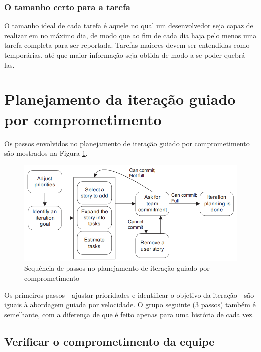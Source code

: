 \documentclass[a4paper,abntfigtabnum,noindentfirst]{abnt}
\begin{document}
\subsubsection{O tamanho certo para a tarefa}

O tamanho ideal de cada tarefa é aquele no qual um desenvolvedor seja capaz de realizar em no máximo dia, de modo que ao fim de cada dia haja pelo menos uma tarefa completa para ser reportada. Tarefas maiores devem ser entendidas como temporárias, até que maior informação seja obtida de modo a se poder quebrá-las.


\section{Planejamento da iteração guiado por comprometimento}

Os passos envolvidos no planejamento de iteração guiado por comprometimento são mostrados na Figura \ref{planejamento-de-iteracao-guiado-por-comprometimento}.

\begin{figure}
  \caption{Sequência de passos no planejamento de iteração guiado por comprometimento}
  \label{planejamento-de-iteracao-guiado-por-comprometimento}
  \begin{center}
  \includegraphics[scale=0.6]{planejamento-de-iteracao-guiado-por-comprometimento}
  \end{center}
\end{figure}

Os primeiros passos - ajustar prioridades e identificar o objetivo da iteração - são iguais à abordagem guiada por velocidade. O grupo seguinte (3 passos) também é semelhante, com a diferença de que é feito apenas para uma história de cada vez.

\subsection{Verificar o comprometimento da equipe}
\end{document}
